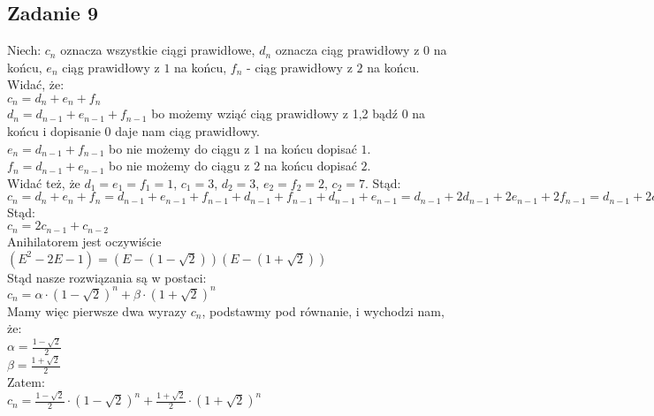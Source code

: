 \documentclass[a4paper]{article}
\begin{document}
\subsection*{Zadanie 9}
Niech: $c_n$ oznacza wszystkie ciągi prawidłowe, $d_n$ oznacza ciąg prawidłowy z $0$ na końcu, $e_n$ ciąg prawidłowy z $1$ na końcu, $f_n$ - ciąg prawidłowy z $2$ na końcu. Widać, że:\\
$c_n=d_n+e_n+f_n$\\
$d_n=d_{n-1}+e_{n-1}+f_{n-1}$ bo możemy wziąć ciąg prawidłowy z 1,2 bądź 0 na końcu i dopisanie 0 daje nam ciąg prawidłowy.\\
$e_n=d_{n-1}+f_{n-1}$ bo nie możemy do ciągu z $1$ na końcu dopisać $1$.\\
$f_n=d_{n-1}+e_{n-1}$  bo nie możemy do ciągu z $2$ na końcu dopisać $2$.\\
Widać też, że $d_1=e_1=f_1=1$, $c_1=3$, $d_2=3$, $e_2=f_2=2$, $c_2=7$. Stąd:\\
$c_n=d_n+e_n+f_n=d_{n-1}+e_{n-1}+f_{n-1}+d_{n-1}+f_{n-1}+d_{n-1}+e_{n-1}=d_{n-1}+2d_{n-1}+2e_{n-1}+2f_{n-1}=d_{n-1}+2c_{n-1}=d_{n-2}+e_{n-2}+f_{n-2}+2c_{n-1}=c_{n-2}+2c_{n-1}$\\
Stąd:\\
$c_n=2c_{n-1}+c_{n-2}$\\
Anihilatorem jest oczywiście $(E^2-2E-1)=(E-(1-\sqrt{2}))(E-(1+\sqrt{2}))$\\
Stąd nasze rozwiązania są w postaci:\\
$c_n=\alpha\cdot (1-\sqrt{2})^n + \beta\cdot (1+\sqrt{2})^n$\\
Mamy więc pierwsze dwa wyrazy $c_n$, podstawmy pod równanie, i wychodzi nam, że:\\
$\alpha =  \frac{1-\sqrt{2}}{2}$\\
$\beta =  \frac{1+\sqrt{2}}{2}$\\
Zatem:\\
$c_n= \frac{1-\sqrt{2}}{2}\cdot (1-\sqrt{2})^n + \frac{1+\sqrt{2}}{2}\cdot (1+\sqrt{2})^n$
\end{document}
